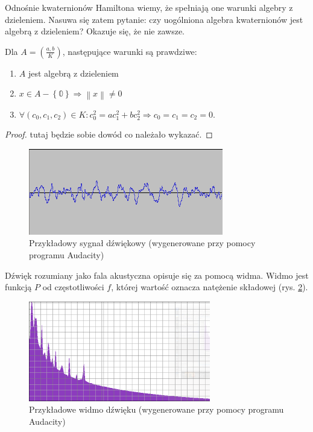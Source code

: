Odnośnie kwaternionów Hamiltona wiemy, że spełniają one warunki algebry z
dzieleniem. Nasuwa się zatem pytanie: czy uogólniona algebra kwaternionów jest
algebrą z dzieleniem? Okazuje się, że nie zawsze.

\begin{twierdzenie}
 Dla $A=\left(\frac{a,b}{K}\right) $, następujące warunki są prawdziwe:
\begin{enumerate}
 \item $A$ jest algebrą z dzieleniem
 \item $x\in A- \left\lbrace \mathbb{0} \right\rbrace \Rightarrow \left\|
x\right\| \neq 0 $
 \item $\forall (c_0,c_1,c_2)\in K : c_0^2=ac_1^2+bc_2^2 \Rightarrow
c_0=c_1=c_2=0$.
\end{enumerate}
\end{twierdzenie}
\begin{proof}
 tutaj będzie sobie dowód
co należało wykazać.
\end{proof}











\newpage
\begin{figure}[h]
\centering
\includegraphics[scale=0.8]{grafika/signal} %
\caption[Przykładowy wykres sygnału dźwiękowego]{Przykładowy sygnał
dźwiękowy (wygenerowane przy pomocy programu Audacity)}
\label{fig:sygnal}
\end{figure}
Dźwięk rozumiany jako fala akustyczna opisuje się za pomocą widma. Widmo
jest funkcją $P$ od częstotliwości $f$, której wartość oznacza natężenie
składowej (rys. \ref{fig:spectra}).
\begin{figure}[h]
\centering
\includegraphics[scale=0.8]{grafika/widmo}
\caption[Przykładowy wykres widma]{Przykładowe widmo
dźwięku (wygenerowane przy pomocy programu Audacity)}
\label{fig:spectra}
\end{figure}

